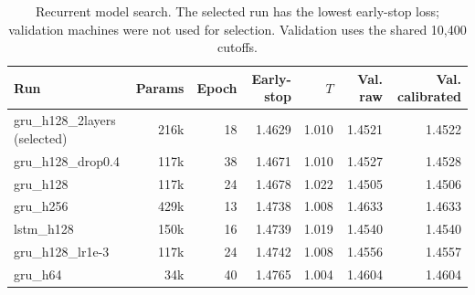 \begin{table}[htbp]
\centering\small
\begin{tabular}{@{}lrrrrrr@{}}
\toprule
Run & Params & Epoch & Early-stop & $T$ & Val. raw & Val. calibrated \\
\midrule
gru\_h128\_2layers (selected) & 216k & 18 & 1.4629 & 1.010 & 1.4521 & 1.4522 \\
gru\_h128\_drop0.4 & 117k & 38 & 1.4671 & 1.010 & 1.4527 & 1.4528 \\
gru\_h128 & 117k & 24 & 1.4678 & 1.022 & 1.4505 & 1.4506 \\
gru\_h256 & 429k & 13 & 1.4738 & 1.008 & 1.4633 & 1.4633 \\
lstm\_h128 & 150k & 16 & 1.4739 & 1.019 & 1.4540 & 1.4540 \\
gru\_h128\_lr1e-3 & 117k & 24 & 1.4742 & 1.008 & 1.4556 & 1.4557 \\
gru\_h64 & 34k & 40 & 1.4765 & 1.004 & 1.4604 & 1.4604 \\
\bottomrule
\end{tabular}
\caption{Recurrent model search. The selected run has the lowest early-stop loss; validation machines were not used for selection. Validation uses the shared 10,400 cutoffs.}
\end{table}
